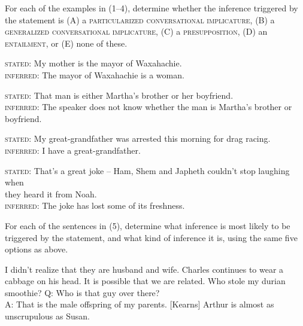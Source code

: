 For each of the examples in (1–4), determine whether the inference triggered by the statement is \textsc{(A)} a \textsc{particularized conversational implicature}, \textsc{(B)} a \textsc{generalized conversational implicature}, \textsc{(C)} a \textsc{presupposition}, (D) an \textsc{entailment}, or (E) none of these.

\begin{stylepoints}
\ea%
    \label{ex:key:1}




          \textsc{stated}: My mother is the mayor of Waxahachie.\\
\textsc{inferred}: The mayor of Waxahachie is a woman.
    \z
\end{stylepoints}

\begin{stylepoints}
\ea%
    \label{ex:key:2}




          \textsc{stated}: That man is either Martha’s brother or her boyfriend.\\
\textsc{inferred}: The speaker does not know whether the man is Martha’s brother or boyfriend.
    \z
\end{stylepoints}

\begin{stylepoints}
\ea%
    \label{ex:key:3}




          \textsc{stated}: My great-grandfather was arrested this morning for drag racing.\\
\textsc{inferred}: I have a great-grandfather.
    \z
\end{stylepoints}

\begin{stylepoints}
\ea%
    \label{ex:key:4}




          \textsc{stated}: That’s a great joke – Ham, Shem and Japheth couldn’t stop laughing when\\
  they heard it from Noah.\\
\textsc{inferred}: The joke has lost some of its freshness.
    \z
\end{stylepoints}

For each of the sentences in (5), determine what inference is most likely to be triggered by the statement, and what kind of inference it is, using the same five options as above.

\ea
    \label{ex:key:5}
\ea%
 I didn’t realize that they are husband and wife.
\ex Charles continues to wear a cabbage on his head.
\ex It is possible that we are related.
\ex  Who stole my durian smoothie?
\ex  Q: Who is that guy over there?\\
A: That is the male offspring of my parents.  [Kearns]
\ex  Arthur is almost as unscrupulous as Susan.
\z
\z

